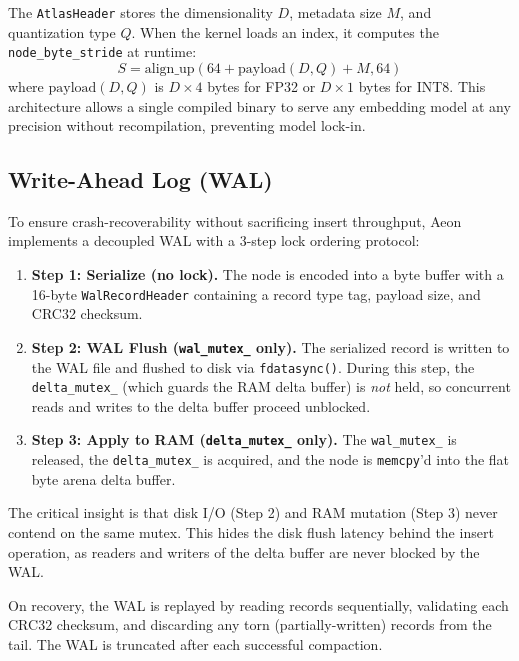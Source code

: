 \documentclass[10pt,twocolumn]{article}
\begin{document}
The \texttt{AtlasHeader} stores the dimensionality $D$, metadata size $M$, and quantization type $Q$. When the kernel loads an index, it computes the \texttt{node\_byte\_stride} at runtime:
\begin{equation}
    S = \text{align\_up}(64 + \text{payload}(D, Q) + M, 64)
\end{equation}
where $\text{payload}(D, Q)$ is $D \times 4$ bytes for FP32 or $D \times 1$ bytes for INT8. This architecture allows a single compiled binary to serve any embedding model at any precision without recompilation, preventing model lock-in.

\subsection{Write-Ahead Log (WAL)}
\label{subsec:wal}
To ensure crash-recoverability without sacrificing insert throughput, Aeon implements a decoupled WAL with a 3-step lock ordering protocol:

\begin{enumerate}
    \item \textbf{Step 1: Serialize (no lock).} The node is encoded into a byte buffer with a 16-byte \texttt{WalRecordHeader} containing a record type tag, payload size, and CRC32 checksum.
    \item \textbf{Step 2: WAL Flush (\texttt{wal\_mutex\_} only).} The serialized record is written to the WAL file and flushed to disk via \texttt{fdatasync()}. During this step, the \texttt{delta\_mutex\_} (which guards the RAM delta buffer) is \emph{not} held, so concurrent reads and writes to the delta buffer proceed unblocked.
    \item \textbf{Step 3: Apply to RAM (\texttt{delta\_mutex\_} only).} The \texttt{wal\_mutex\_} is released, the \texttt{delta\_mutex\_} is acquired, and the node is \texttt{memcpy}'d into the flat byte arena delta buffer.
\end{enumerate}

The critical insight is that disk I/O (Step 2) and RAM mutation (Step 3) never contend on the same mutex. This hides the disk flush latency behind the insert operation, as readers and writers of the delta buffer are never blocked by the WAL.

On recovery, the WAL is replayed by reading records sequentially, validating each CRC32 checksum, and discarding any torn (partially-written) records from the tail. The WAL is truncated after each successful compaction.
\end{document}
